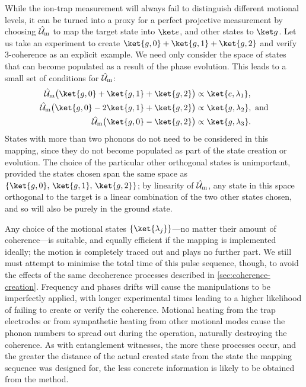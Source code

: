While the ion-trap measurement will always fail to distinguish different motional levels, it can be turned into a proxy for a perfect projective measurement by choosing $\hat{\mathcal U}_{\text m}$ to map the target state into $\ket e$, and other states to $\ket g$.
Let us take an experiment to create $\ket{g,0} + \ket{g,1} + \ket{g,2}$ and verify 3-coherence as an explicit example.
We need only consider the space of states that can become populated as a result of the phase evolution.
This leads to a small set of conditions for $\hat{\mathcal U}_{\text m}$:
\begin{equation}\label{eq:coherence-measurement-mapping}\begin{aligned}
\hat{\mathcal U}_{\text m} \bigl(\ket{g,0} + \ket{g,1} + \ket{g,2}\bigr) &\propto \ket{e,\lambda_1},\\
\hat{\mathcal U}_{\text m} \bigl(\ket{g,0} - 2\ket{g,1} + \ket{g,2}\bigr) &\propto \ket{g,\lambda_2},\text{ and}\\
\hat{\mathcal U}_{\text m} \bigl(\ket{g,0} - \ket{g,2}\bigr) &\propto \ket{g,\lambda_3}.
\end{aligned}\end{equation}
States with more than two phonons do not need to be considered in this mapping, since they do not become populated as part of the state creation or evolution.
The choice of the particular other orthogonal states is unimportant, provided the states chosen span the same space as $\{\ket{g,0},\,\ket{g,1},\,\ket{g,2}\}$; by linearity of $\hat{\mathcal U}_{\text m}$, any state in this space orthogonal to the target is a linear combination of the two other states chosen, and so will also be purely in the ground state.

Any choice of the motional states $\{\ket{\lambda_j}\}$---no matter their amount of coherence---is suitable, and equally efficient if the mapping is implemented ideally; the motion is completely traced out and plays no further part.
We still must attempt to minimise the total time of this pulse sequence, though, to avoid the effects of the same decoherence processes described in \cref{sec:coherence-creation}.
Frequency and phases drifts will cause the manipulations to be imperfectly applied, with longer experimental times leading to a higher likelihood of failing to create or verify the coherence.
Motional heating from the trap electrodes or from sympathetic heating from other motional modes cause the phonon numbers to spread out during the operation, naturally destroying the coherence.
As with entanglement witnesses, the more these processes occur, and the greater the distance of the actual created state from the state the mapping sequence was designed for, the less concrete information is likely to be obtained from the method.

